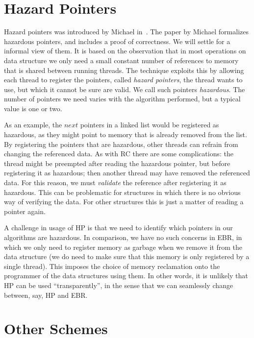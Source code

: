 \documentclass[b5paper]{report}
\begin{document}


\section{Hazard Pointers}

Hazard pointers was introduced by Michael in~\cite{michael2004hazard}.
The paper by Michael formalizes hazardous pointers, and includes a proof of
correctness. We will settle for a informal view of them. It is
based on the observation that in most operations on data structure we only need
a small constant number of references to memory that is shared between running
threads. The technique exploits this by allowing each thread to register the
pointers, called \emph{hazard pointers}, the thread wants to use, but which it
cannot be sure are valid. We call such pointers \emph{hazardous}. The number of
pointers we need varies with the algorithm performed, but a typical value is one
or two.

As an example, the $next$ pointers in a linked list would be registered as
hazardous, as they might point to memory that is already removed from the list.
By registering the pointers that are hazardous, other threads can refrain from
changing the referenced data. As with RC there are some complications: the
thread might be preempted after reading the hazardous pointer, but before
registering it as hazardous; then another thread may have removed the referenced
data. For this reason, we must \emph{validate} the reference after registering
it as hazardous. This can be problematic for structures in which there is no
obvious way of verifying the data. For other structures this is just a matter of
reading a pointer again.

A challenge in usage of HP is that we need to identify which pointers in our
algorithms are hazardous. In comparison, we have no such concerns in EBR, in
which we only need to register memory as garbage when we remove it from the data
structure (we do need to make sure that this memory is only registered by a
single thread). This imposes the choice of memory reclamation onto the
programmer of the data structures using them. In other words, it is unlikely
that HP can be used ``transparently'', in the sense that we can seamlessly
change between, say, HP and EBR\@.



\section{Other Schemes}
\end{document}

